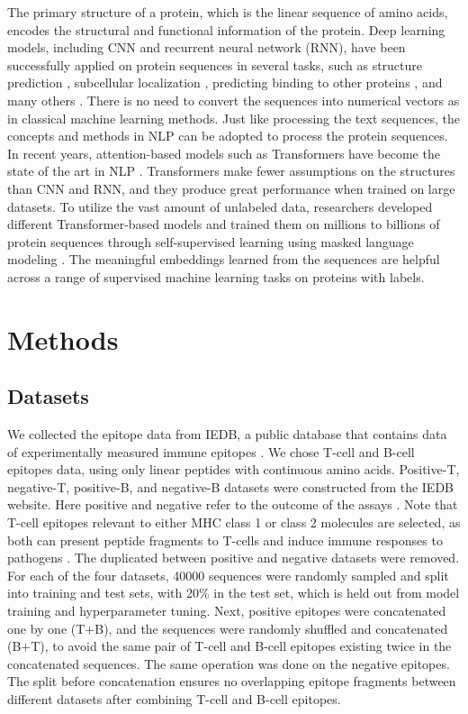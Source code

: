 \documentclass[conference]{IEEEtran}
\begin{document}
The primary structure of a protein, which is the linear sequence of amino acids, encodes the structural and functional information of the protein. Deep learning models, including CNN and recurrent neural network (RNN), have been successfully applied on protein sequences in several tasks, such as structure prediction \cite{Klausen_2019}, subcellular localization \cite{S_nderby_2015}, predicting binding to other proteins \cite{Vielhaben_2020}, and many others \cite{rao2019evaluating}. There is no need to convert the sequences into numerical vectors as in classical machine learning methods. Just like processing the text sequences, the concepts and methods in NLP can be adopted to process the protein sequences. In recent years, attention-based models such as Transformers have become the state of the art in NLP \cite{vaswani2017attention}. Transformers make fewer assumptions on the structures than CNN and RNN, and they produce great performance when trained on large datasets. To utilize the vast amount of unlabeled data, researchers developed different Transformer-based models and trained them on millions to billions of protein sequences through self-supervised learning using masked language modeling \cite{Elnaggar_2021,Nambiar_2020,Rives_2021}. The meaningful embeddings learned from the sequences are helpful across a range of supervised machine learning tasks on proteins with labels.

\section{Methods}
\subsection{Datasets}
We collected the epitope data from IEDB, a public database that contains data of experimentally measured immune epitopes \cite{Fleri_2017a}. We chose T-cell and B-cell epitopes data, using only linear peptides with continuous amino acids. Positive-T, negative-T, positive-B, and negative-B datasets were constructed from the IEDB website. Here positive and negative refer to the outcome of the assays \cite{Fleri_2017b}. Note that T-cell epitopes relevant to either MHC class 1 or class 2 molecules are selected, as both can present peptide fragments to T-cells and induce immune responses to pathogens \cite{janeway2001major}. The duplicated between positive and negative datasets were removed. For each of the four datasets, 40000 sequences were randomly sampled and split into training and test sets, with 20\% in the test set, which is held out from model training and hyperparameter tuning. Next, positive epitopes were concatenated one by one (T$+$B), and the sequences were randomly shuffled and concatenated (B$+$T), to avoid the same pair of T-cell and B-cell epitopes existing twice in the concatenated sequences. The same operation was done on the negative epitopes. The split before concatenation ensures no overlapping epitope fragments between different datasets after combining T-cell and B-cell epitopes.
\end{document}
